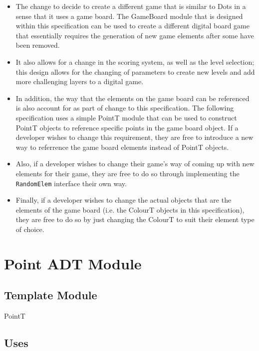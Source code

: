 \documentclass[12pt]{article}
\begin{document}
\begin{itemize}

\item The change to decide to create a different game that is similar to Dots in a sense that it uses a game board. The GameBoard module that is designed within this specification can be used to create a different digital board game that essentially requires the generation of new game elements after some have been removed.

\item It also allows for a change in the scoring system, as well as the level selection; this design allows for the changing of parameters to create new levels and add more challenging layers to a digital game.

\item In addition, the way that the elements on the game board can be referenced is also account for as part of change to this specification. The following specification uses a simple PointT module that can be used to construct PointT objects to reference specific points in the game board object. If a developer wishes to change this requirement, they are free to introduce a new way to referrence the game board elements instead of PointT objects.

\item Also, if a developer wishes to change their game's way of coming up with new elements for their game, they are free to do so through implementing the \verb|RandomElem| interface their own way.

\item Finally, if a developer wishes to change the actual objects that are the elements of the game board (i.e. the ColourT objects in this specification), they are free to do so by just changing the ColourT to suit their element type of choice.

\end{itemize}

\newpage

\section* {Point ADT Module}

\subsection*{Template Module}

PointT

\subsection* {Uses}
\end{document}
